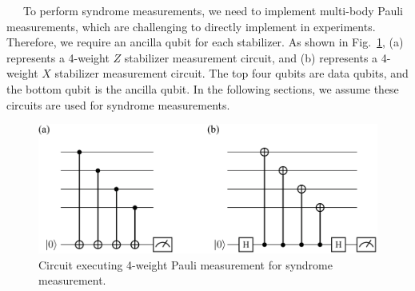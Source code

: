 \documentclass[a4paper,11pt]{ltjsarticle}
\begin{document}
{{{            \ \ \ To perform syndrome measurements, we need to implement multi-body Pauli measurements, which are challenging to directly implement in experiments. Therefore, we require an ancilla qubit for each stabilizer. As shown in Fig.~\ref{syndrome_measurement_circuit}, (a) represents a 4-weight $Z$ stabilizer measurement circuit, and (b) represents a 4-weight $X$ stabilizer measurement circuit. The top four qubits are data qubits, and the bottom qubit is the ancilla qubit. In the following sections, we assume these circuits are used for syndrome measurements.


            \begin{figure}[h]
                \centering
                \includegraphics[scale=0.30]{figure/syndrome_measurement_circuit.eps}
                \vspace{-100pt}\caption{Circuit executing 4-weight Pauli measurement for syndrome measurement.}
                \label{syndrome_measurement_circuit}
                \vspace{-10pt}
            \end{figure}
        }

}}
\end{document}
